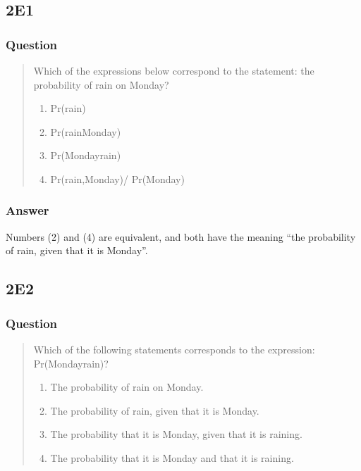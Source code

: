 \documentclass[
]{book}
\providecommand{\tightlist}{%
  \setlength{\itemsep}{0pt}\setlength{\parskip}{0pt}}
\begin{document}
\hypertarget{e1}{%
\subsection*{2E1}\label{e1}}

\hypertarget{question}{%
\subsubsection*{Question}\label{question}}

\begin{quote}
Which of the expressions below correspond to the statement: the probability of rain on Monday?

\begin{enumerate}
\def\labelenumi{(\arabic{enumi})}
\tightlist
\item
  Pr(rain)
\item
  Pr(rain\textbar Monday)
\item
  Pr(Monday\textbar rain)
\item
  Pr(rain,Monday)/ Pr(Monday)
\end{enumerate}
\end{quote}

\hypertarget{answer}{%
\subsubsection*{Answer}\label{answer}}

Numbers (2) and (4) are equivalent, and both have the meaning ``the probability of rain, given that it is Monday''.

\hypertarget{e2}{%
\subsection*{2E2}\label{e2}}

\hypertarget{question-1}{%
\subsubsection*{Question}\label{question-1}}

\begin{quote}
Which of the following statements corresponds to the expression: Pr(Monday\textbar rain)?

\begin{enumerate}
\def\labelenumi{(\arabic{enumi})}
\tightlist
\item
  The probability of rain on Monday.
\item
  The probability of rain, given that it is Monday.
\item
  The probability that it is Monday, given that it is raining.
\item
  The probability that it is Monday and that it is raining.
\end{enumerate}
\end{quote}
\end{document}
